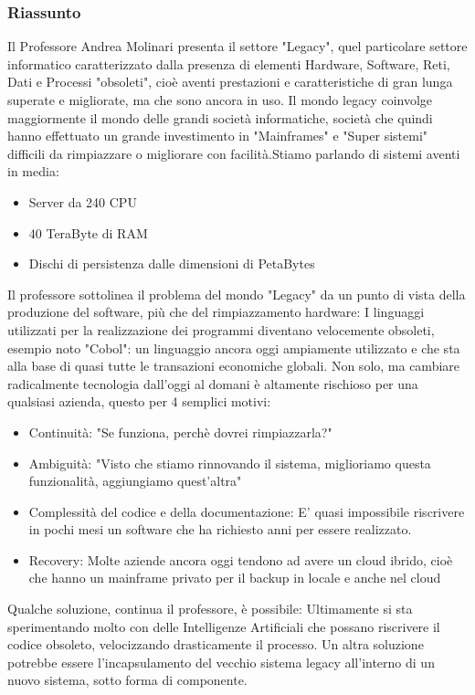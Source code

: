 \documentclass{report}
\begin{document}
\subsubsection*{Riassunto}
Il Professore Andrea Molinari presenta il settore "Legacy", quel particolare settore informatico caratterizzato dalla presenza di elementi Hardware, Software, Reti, Dati e Processi "obsoleti", cioè aventi prestazioni e caratteristiche di gran lunga superate e migliorate, ma che sono ancora in uso.
Il mondo legacy coinvolge maggiormente il mondo delle grandi società informatiche, società che quindi hanno effettuato un grande investimento in "Mainframes" e "Super sistemi" difficili da rimpiazzare o migliorare con facilità.Stiamo parlando di sistemi aventi in media:
\begin{itemize}
	\item Server da 240 CPU
	\item 40 TeraByte di RAM
	\item Dischi di persistenza dalle dimensioni di PetaBytes
\end{itemize}
Il professore sottolinea il problema del mondo "Legacy" da un punto di vista della produzione del software, più che del rimpiazzamento hardware:
I linguaggi utilizzati per la realizzazione dei programmi diventano velocemente obsoleti, esempio noto "Cobol": un linguaggio ancora oggi ampiamente utilizzato e che sta alla base di quasi tutte le transazioni economiche globali.
Non solo, ma cambiare radicalmente tecnologia dall'oggi al domani è altamente rischioso per una qualsiasi azienda, questo per 4 semplici motivi:
\begin{itemize}
	\item Continuità: "Se funziona, perchè dovrei rimpiazzarla?"
	\item Ambiguità: "Visto che stiamo rinnovando il sistema, miglioriamo questa funzionalità, aggiungiamo quest'altra"
	\item Complessità del codice e della documentazione: E' quasi impossibile riscrivere  in pochi mesi un software che ha richiesto anni per essere realizzato.
	\item Recovery: Molte aziende ancora oggi tendono ad avere un cloud ibrido, cioè che hanno un mainframe privato per il backup in locale e anche nel cloud
\end{itemize}
Qualche soluzione, continua il professore, è possibile:
Ultimamente si sta sperimentando molto con delle Intelligenze Artificiali che possano riscrivere il codice obsoleto, velocizzando drasticamente il processo. Un altra soluzione potrebbe essere l'incapsulamento del vecchio sistema legacy all'interno di un nuovo sistema, sotto forma di componente.
\end{document}
